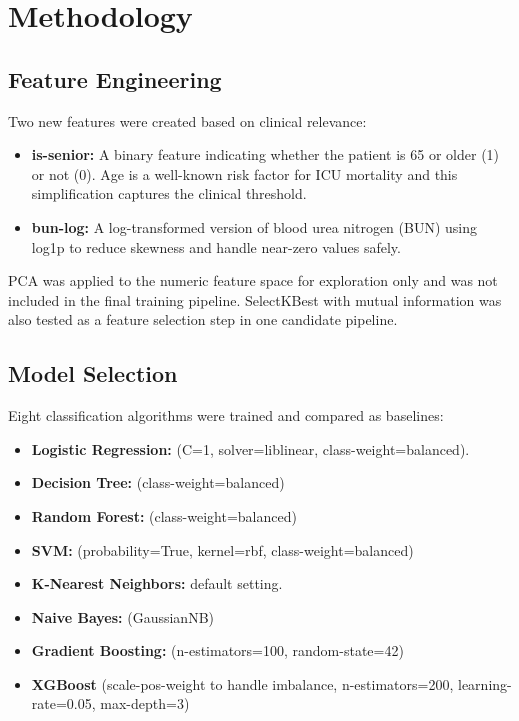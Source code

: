 \documentclass[11pt]{article}
\begin{document}
\section{Methodology}

\subsection{Feature Engineering
} Two new features were created based on clinical relevance:
\begin{itemize}
    \item \textbf{is-senior:} A binary feature indicating whether the patient is 65 or older (1) or not (0). Age is a well-known risk factor for ICU mortality and this simplification captures the clinical threshold.
    \item \textbf{bun-log: } A log-transformed version of blood urea nitrogen (BUN) using log1p to reduce skewness and handle near-zero values safely.

   
    \end{itemize}
PCA was applied to the numeric feature space for exploration only and was not included in the final training pipeline. SelectKBest with mutual information was also tested as a feature selection step in one candidate pipeline.

\subsection{Model Selection
} Eight classification algorithms were trained and compared as baselines:
\begin{itemize}
    \item \textbf{Logistic Regression:} (C=1, solver=liblinear, class-weight=balanced).

    \item \textbf{Decision Tree:} (class-weight=balanced)

    \item \textbf{Random Forest:} (class-weight=balanced)

    \item \textbf{SVM:}  (probability=True, kernel=rbf, class-weight=balanced)

    \item \textbf{K-Nearest Neighbors:} default setting.
    \item \textbf{Naive Bayes: }(GaussianNB)
    \item \textbf{Gradient Boosting:}  (n-estimators=100, random-state=42)

    \item \textbf{XGBoost} (scale-pos-weight to handle imbalance, n-estimators=200, learning-rate=0.05, max-depth=3)
 
    \end{itemize}
    
\end{document}

